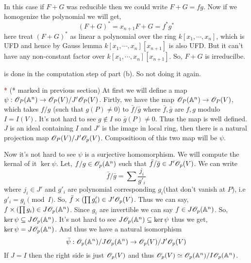 \documentclass[12pt]{article}
\begin{document}
\vspace*{0.2cm}

\noindent  \textcolor{maroon}{} In this case if $F+G$ was reducible then we could write $F+G = fg$. Now if we homogenize the polynomial we will get, $$(F+G)^{\ast} = x_{n+1}F+G = f^{\ast} g^{\ast}$$ here treat $(F+G)^{\ast}$ as linear a polynomial over the ring $k[x_1,\cdots,x_n]$, which is UFD and hence by Gauss lemma $k[x_1,\cdots,x_n][x_{n+1}]$ is also UFD. But it can't have any non-constant factor over $k[x_1,\cdots,x_n][x_{n+1}]$. So, $F+G$ is irreducilbe.

\vspace*{0.2cm}

\noindent \textcolor{maroon}{} is done in the computation step of  part (b). So not doing it again.

\vspace*{0.2cm}

\noindent \textcolor{maroon}{*} (* marked in previous section) At first we will define a map $\psi : \mathscr{O}_P(\mathbb{A}^n) \to \mathscr{O}_P(V)/J'\mathscr{O}_P(V)$. Firtly, we have the map $\mathscr{O}_P(\mathbb{A}^n) \to \mathscr{O}_P(V)$, which takes $f/g$ (such that $g(P)\neq 0$) to $\bar{f}/\bar{g}$ where $\bar{f},\bar{g}$ are $f,g$ modulo $I = I(V)$. It's not hard to see $g \notin I$ so $\bar{g}(P)\neq0$. Thus the map is well defined. $J$ is an ideal containing $I$ and $J'$ is the image in local ring, then there is a natural projection map $\mathscr{O}_P(V)/J'\mathscr{O}_p(V)$. Compositioon of this two map will be $\psi$.

\vspace*{0.2cm}

Now it's not hard to see $\psi$ is a surjective homomorphism. We will compute the kernal of it $\ker \psi$. Let, $f/g \in \mathscr{O}_p(\mathbb{A}^n)$ such that $\bar{f}/\bar{g} \in J'\mathscr{O}_p(V)$. We can write $$\bar{f}/\bar{g} = \sum \frac{j_i}{g'_i}$$ where $j_i \in J'$ and $g'_i$ are polynomial corresponding $g_i$(that don't vanish at $P$), i.e $g'_i =g_i \pmod{I}$. So, $\bar{f} \times \qty(\prod g'_i) \in J'\mathscr{O}_p(V)$. Thus we can say, $f \times \qty(\prod g_i) \in J\mathscr{O}_p(\mathbb{A}^n)$. Since $g_i$ are invertible we can say $f \in J\mathscr{O}_p(\mathbb{A}^n)$. So, $\ker \psi \subseteq J\mathscr{O}_p(\mathbb{A}^n)$. It's not hard to see $J\mathscr{O}_p(\mathbb{A}^n) \subseteq \ker \psi$ thus we get, $\ker \psi = J\mathscr{O}_p(\mathbb{A}^n)$. And thus we have a natural isomorphism $$\bar{\psi}: \mathscr{O}_p(\mathbb{A}^n)/J\mathscr{O}_p(\mathbb{A}^n) \to \mathscr{O}_p(V)/J'\mathscr{O}_p(V)$$  If $J=I$ then the right side is just $\mathscr{O}_p(V)$ and thus $\mathscr{O}_p(V)\simeq \mathscr{O}_p(\mathbb{A}^n)/I\mathscr{O}_p(\mathbb{A}^n)$.
\end{document}
